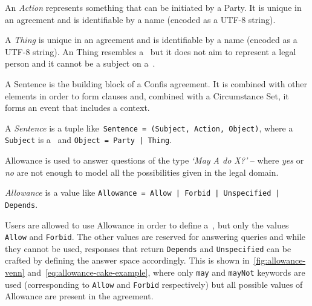 \begin{definition}[Action]
    \label{def:action}
    An \emph{Action} represents something that can be initiated by a Party.
    It is unique in an agreement and is identifiable by a name (encoded as a UTF-8 string).
\end{definition}

\begin{definition}[Thing]
    \label{def:thing}
    A \emph{Thing} is unique in an agreement and is identifiable by a name (encoded as a UTF-8 string).
    An Thing resembles a~ but it does not aim to represent a legal person and it cannot be a subject on a~.
\end{definition}

A Sentence is the building block of a Confis agreement.
It is combined with other elements in order to form clauses and, combined with a Circumstance Set, it forms an event that includes a context.

\begin{definition}[Sentence]
    \label{def:sentence}
    A \emph{Sentence} is a tuple like~\texttt{Sentence = (Subject, Action, Object)}, where a \texttt{Subject} is a~ and \texttt{Object = Party | Thing}.
\end{definition}

Allowance is used to answer questions of the type \emph{`May A do X?'} -- where \emph{yes} or \emph{no} are not enough to model all the possibilities given in the legal domain.


\begin{definition}[Allowance]
    \label{def:allowance}
    \emph{Allowance} is a value like \texttt{Allowance = Allow | Forbid | Unspecified | Depends}.
\end{definition}

Users are allowed to use Allowance in order to define a~, but only the values \texttt{Allow} and \texttt{Forbid}.
The other values are reserved for answering queries and while they cannot be used, responses that return \texttt{Depends} and \texttt{Unspecified} can be crafted by defining the answer space accordingly.
This is shown in~\autoref{fig:allowance-venn} and~\autoref{eq:allowance-cake-example}, where only \texttt{may} and \texttt{mayNot} keywords are used (corresponding to \texttt{Allow} and \texttt{Forbid} respectively) but all possible values of Allowance are present in the agreement.

